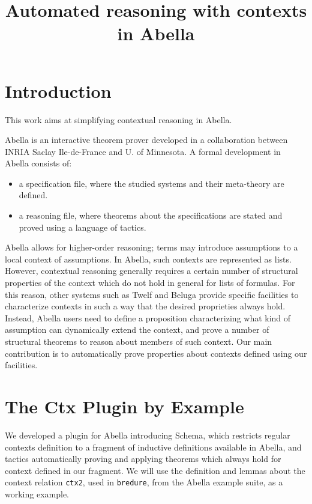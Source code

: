 \documentclass[nocopyrightspace,authoryear]{sigplanconf}
\title{Automated reasoning with contexts in Abella}
\begin{document}
\maketitle
\section{Introduction}
This work aims at simplifying contextual reasoning in Abella.

Abella \cite{abellasys} is an interactive theorem prover developed in a collaboration between INRIA Saclay Ile-de-France and U. of Minnesota. A formal development in Abella consists of:
\begin{itemize}
\item a specification file, where the studied systems and their meta-theory are defined.
\item a reasoning file, where theorems about the specifications are stated and proved using a language of tactics.
\end{itemize}

Abella allows for higher-order reasoning; terms may introduce assumptions to a local context of assumptions. In Abella, such contexts are represented as lists. However, contextual reasoning generally requires a certain number of structural properties of the context which do not hold in general for lists of formulas. For this reason, other systems such as Twelf \cite{twelfsys} and Beluga \cite{belugasys} provide specific facilities to characterize contexts in such a way that the desired proprieties always hold. Instead, Abella users need to define a proposition characterizing what kind of assumption can dynamically extend the context, and prove a number of structural theorems to reason about members of such context. Our main contribution is to automatically prove properties about contexts defined using our facilities.

\section{The Ctx Plugin by Example}

We developed a plugin for Abella introducing Schema, which restricts regular contexts definition to a fragment of inductive definitions available in Abella, and tactics automatically proving and applying theorems which always hold for context defined in our fragment. We will use the definition and lemmas about the context relation \lstinline|ctx2|, used in \lstinline|bredure|, from the Abella example suite, as a working example.
\end{document}

